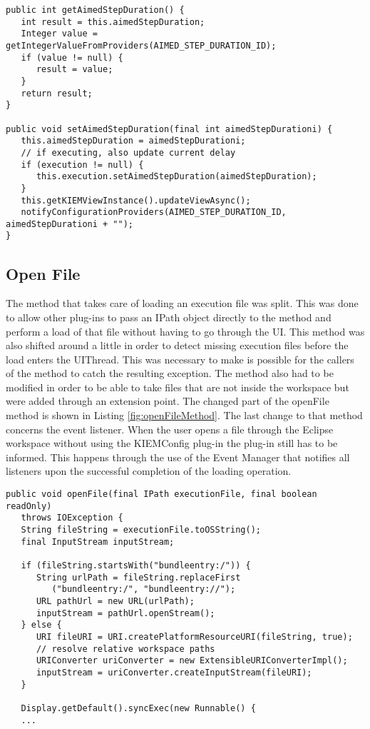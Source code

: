 \begin{lstlisting}
public int getAimedStepDuration() {
   int result = this.aimedStepDuration;
   Integer value = getIntegerValueFromProviders(AIMED_STEP_DURATION_ID);
   if (value != null) {
      result = value;
   }
   return result;
}

public void setAimedStepDuration(final int aimedStepDurationi) {
   this.aimedStepDuration = aimedStepDurationi;
   // if executing, also update current delay
   if (execution != null) {
      this.execution.setAimedStepDuration(aimedStepDuration);
   }
   this.getKIEMViewInstance().updateViewAsync();
   notifyConfigurationProviders(AIMED_STEP_DURATION_ID, aimedStepDurationi + "");
}
\end{lstlisting}


\subsection{Open File}
The method that takes care of loading an execution file was split. This was done to allow
other plug-ins to pass an IPath object directly to the method and perform a load of that file without
having to go through the \ac{UI}. This method was also shifted around a little in order to detect
missing execution files before the load enters the UIThread. This was necessary to make is possible for
the callers of the method to catch the resulting exception.
The method also had to be modified in order to be able to take files that are not inside the workspace
but were added through an extension point. The changed part of the openFile method is shown in 
Listing \ref{fig:openFileMethod}.
The last change to that method concerns the event listener. When the user opens a file through the
Eclipse workspace without using the \ac{KIEMConfig} plug-in the plug-in still has to be informed.
This happens through the use of the Event Manager that notifies all listeners upon the successful
completion of the loading operation.

\begin{lstlisting}
public void openFile(final IPath executionFile, final boolean readOnly) 
   throws IOException {
   String fileString = executionFile.toOSString();
   final InputStream inputStream;
   
   if (fileString.startsWith("bundleentry:/")) {
      String urlPath = fileString.replaceFirst
         ("bundleentry:/", "bundleentry://");
      URL pathUrl = new URL(urlPath);
      inputStream = pathUrl.openStream();
   } else {
      URI fileURI = URI.createPlatformResourceURI(fileString, true);
      // resolve relative workspace paths
      URIConverter uriConverter = new ExtensibleURIConverterImpl();
      inputStream = uriConverter.createInputStream(fileURI);
   }

   Display.getDefault().syncExec(new Runnable() {
   ...
\end{lstlisting}


